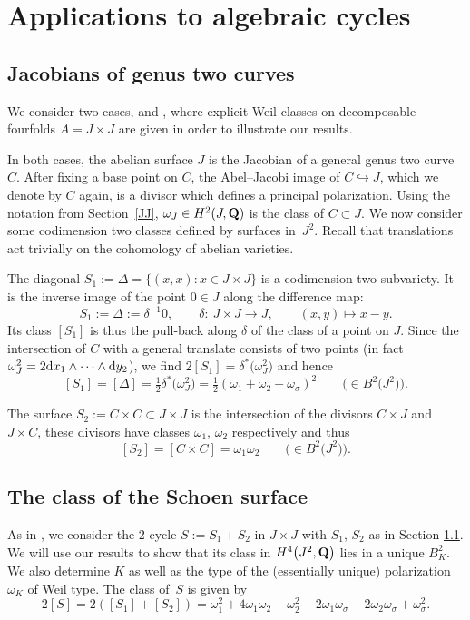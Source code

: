 \documentclass[10pt,a4paper]{amsart}
\numberwithin{equation}{section}
\begin{document}
\section{Applications to algebraic cycles}\label{cycles}

\subsection{Jacobians of genus two curves}\label{jacs}
We consider two cases, \cite{schoen} and \cite{vG}, where explicit Weil classes
on decomposable fourfolds $A=J\times J$ are given in order to illustrate
our results.

In both cases, the abelian surface $J$ is the Jacobian of a general genus two curve $C$.
After fixing a base point on $C$,
the Abel--Jacobi image of $C\hookrightarrow J$,
which we denote by $C$ again,
is a divisor which defines a principal polarization.
Using the notation from Section~\ref{JJ},
$\omega_J\in H^2(J,{\bf Q})$ is the class of $C\subset J$.
We now consider some codimension two classes defined by surfaces in~$J^2$.
Recall that translations act trivially on the cohomology of abelian varieties.

The diagonal $S_1:=\Delta=\{(x,x)\colon x\in J\times J\}$ is a codimension two subvariety.
It is the inverse image of the point $0\in J$ along the difference map:
\[
S_1 := \Delta := \delta^{-1}0,\qquad
\delta\colon \ J\times J \longrightarrow J,\qquad(x,y)\longmapsto x-y.
\]
Its class $[S_1]$ is thus the pull-back along $\delta$ of the class of a point on $J$.
Since the intersection of $C$ with a general translate consists
of two points (in fact $\omega_J^2=2{\rm d} x_1\wedge\dots \wedge{\rm d} y_2$),
we find $2[S_1]=\delta^*\big(\omega_J^2\big)$ and hence
\[
[S_1] = [\Delta] = \tfrac{1}{2} \delta^*\big(\omega_J^2\big) =
\tfrac{1}{2} (\omega_1+\omega_2-\omega_\sigma)^2\qquad\big(\!\!\in B^2\big(J^2\big)\big).
\]

The surface $S_2:=C\times C\subset J\times J$ is the intersection of the divisors
$C\times J$ and $J\times C$, these divisors have classes $\omega_1$, $\omega_2$ respectively and thus
\[
[S_2] = [C\times C] = \omega_1\omega_2\qquad\big(\!\!\in B^2\big(J^2\big)\big).
\]

\subsection{The class of the Schoen surface}\label{cc}
As in \cite{schoen}, we consider the 2-cycle $S:=S_1+S_2$ in $J\times J$
with $S_1$, $S_2$ as in Section \ref{jacs}. We will use our results to show that its
class in $H^4\big(J^2,{\bf Q}\big)$ lies in a unique $B^2_K$.
We also determine $K$ as well as the type of the (essentially
unique) polarization $\omega_K$ of Weil type. The class of~$S$ is given by
\[
2[S] = 2([S_1]+[S_2]) = \omega_1^2 + 4\omega_1\omega_2 + \omega_2^2
 - 2\omega_1\omega_\sigma - 2\omega_2\omega_\sigma + \omega_\sigma^2.
\]
\end{document}
